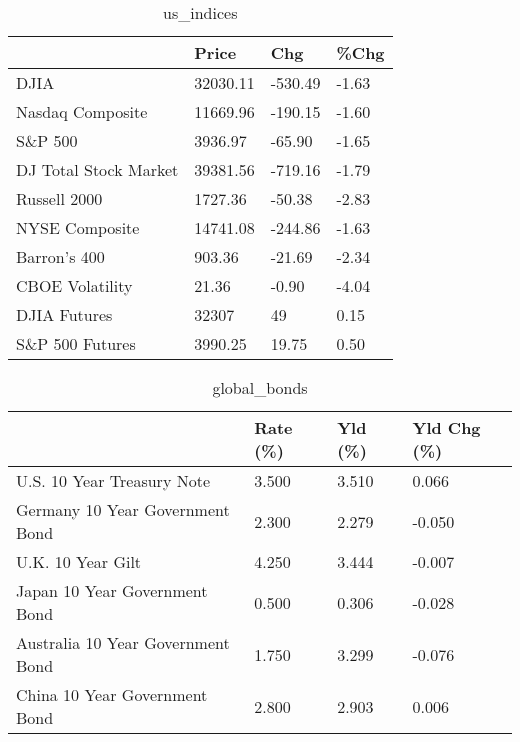 \documentclass{article}%
\begin{document}
%


\begin{table}[htbp]%
\caption{us\_indices}%
\centering%
\begin{adjustbox}{width=1\textwidth}%
\begin{tabular}{llll}
\toprule
                      &    Price &     Chg &  \%Chg \\
\midrule
                 DJIA & 32030.11 & -530.49 & -1.63 \\
     Nasdaq Composite & 11669.96 & -190.15 & -1.60 \\
              S\&P 500 &  3936.97 &  -65.90 & -1.65 \\
DJ Total Stock Market & 39381.56 & -719.16 & -1.79 \\
         Russell 2000 &  1727.36 &  -50.38 & -2.83 \\
       NYSE Composite & 14741.08 & -244.86 & -1.63 \\
         Barron's 400 &   903.36 &  -21.69 & -2.34 \\
      CBOE Volatility &    21.36 &   -0.90 & -4.04 \\
         DJIA Futures &    32307 &      49 &  0.15 \\
      S\&P 500 Futures &  3990.25 &   19.75 &  0.50 \\
\bottomrule
\end{tabular}
%
\end{adjustbox}%
\end{table}

%


\begin{table}[htbp]%
\caption{global\_bonds}%
\centering%
\begin{adjustbox}{width=1\textwidth}%
\begin{tabular}{llll}
\toprule
                                  & Rate (\%) & Yld (\%) & Yld Chg (\%) \\
\midrule
       U.S. 10 Year Treasury Note &    3.500 &   3.510 &       0.066 \\
  Germany 10 Year Government Bond &    2.300 &   2.279 &      -0.050 \\
                U.K. 10 Year Gilt &    4.250 &   3.444 &      -0.007 \\
    Japan 10 Year Government Bond &    0.500 &   0.306 &      -0.028 \\
Australia 10 Year Government Bond &    1.750 &   3.299 &      -0.076 \\
    China 10 Year Government Bond &    2.800 &   2.903 &       0.006 \\
\bottomrule
\end{tabular}
%
\end{adjustbox}%
\end{table}
\end{document}
